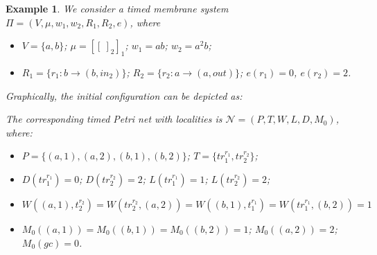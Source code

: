 \documentclass{eptcs}
\newtheorem{example}{Example}
\begin{document}
\begin{example}
We consider a timed membrane system $\Pi=(V,\mu,w_1,w_2,R_1,R_2,e)$,
where
\begin{itemize}
\item $V=\{a,b\}$; \qquad $\mu=[[~]_2]_1$; \qquad
$w_1=ab$; \qquad $w_2=a^2b$;
\item $R_1=\{r_1: b \rightarrow (b,in_2)\}$; \qquad
$R_2=\{r_2: a \rightarrow (a,out)\}$; \qquad
 $e(r_1)=0$, $e(r_2)=2$.
\end{itemize}

Graphically, the initial configuration can be depicted as:

\begin{center}
\end{center}


\noindent The corresponding timed Petri net with localities is
$\mathcal{N}=(P,T,W,L,D,M_0)$, where:
\begin{itemize}
\item $P=\{(a,1),(a,2),(b,1),(b,2)\}$; \qquad
$T=\{tr^{r_1}_1,tr^{r_2}_2\}$;

\item $D(tr^{r_1}_1)=0$; \qquad $D(tr^{r_2}_2)=2$; \qquad
$L(tr^{r_1}_1)=1$; \qquad $L(tr^{r_2}_2)=2$;

\item $W((a,1),t^{r_2}_2)=W(tr^{r_2}_2,(a,2))=W((b,1),t^{r_1}_1)=W(tr^{r_1}_1,(b,2))=1$

\item $M_0((a,1))=M_0((b,1))=M_0((b,2))=1$; \qquad $M_0((a,2))=2$; \qquad $M_0(gc)=0$.
\end{itemize}


\end{example}
\end{document}
